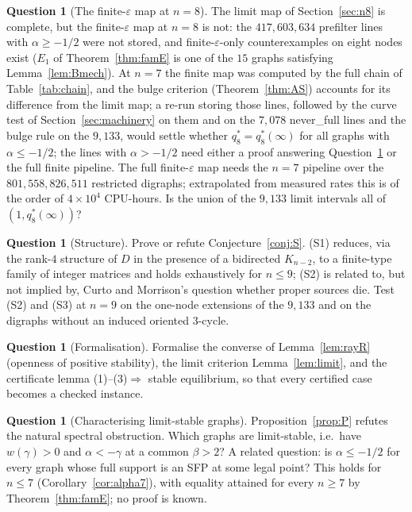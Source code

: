 \documentclass[11pt]{article}
\theoremstyle{definition}
\newtheorem{question}[theorem]{Question}
\newcommand{\eps}{\varepsilon}
\begin{document}
{\begin{question}[The finite-$\eps$ map at $n=8$]
The limit map of Section~\ref{sec:n8} is complete, but the finite-$\eps$ map at $n=8$ is not: the $417{,}603{,}634$ prefilter
lines with $\alpha\ge-1/2$ were not stored, and finite-$\eps$-only counterexamples on eight nodes exist ($E_1$ of
Theorem~\ref{thm:famE} is one of the $15$ graphs satisfying Lemma~\ref{lem:Bmech}). At $n=7$ the finite map was computed by
the full chain of Table~\ref{tab:chain}, and the bulge criterion (Theorem~\ref{thm:AS}) accounts for its difference from the
limit map; a re-run storing those lines, followed by the curve test of Section~\ref{sec:machinery} on them and on the $7{,}078$
never\_full lines and the bulge rule on the $9{,}133$, would settle whether $q_8^*=q_8^*(\infty)$ for all graphs with
$\alpha\le-1/2$; the lines with $\alpha>-1/2$ need either a proof answering Question~\ref{q:char} or the full finite pipeline.
The full finite-$\eps$ map needs the $n=7$ pipeline over the $801{,}558{,}826{,}511$ restricted digraphs; extrapolated from
measured rates this is of the order of $4\times10^4$ CPU-hours.
Is the union of the $9{,}133$ limit intervals all of $(1,q_8^*(\infty))$?
\end{question}

\begin{question}[Structure]
Prove or refute Conjecture~\ref{conj:S}. (S1) reduces, via the rank-$4$ structure of $D$ in the presence of a bidirected
$K_{n-2}$, to a finite-type family of integer matrices and holds exhaustively for $n\le9$; (S2) is related to, but not
implied by, Curto and Morrison's question whether proper sources die. Test (S2) and (S3) at $n=9$ on the one-node extensions
of the $9{,}133$ and on the digraphs without an induced oriented $3$-cycle.
\end{question}

\begin{question}[Formalisation]
Formalise the converse of Lemma~\ref{lem:rayR} (openness of positive stability), the limit criterion Lemma~\ref{lem:limit}, and the
certificate lemma (1)--(3)$\Rightarrow$ stable equilibrium, so that every certified case becomes a checked instance.
\end{question}

\begin{question}[Characterising limit-stable graphs]\label{q:char}
Proposition~\ref{prop:P} refutes the natural spectral obstruction. Which graphs are limit-stable, i.e.\ have $w(\gamma)>0$ and
$\alpha<-\gamma$ at a common $\beta>2$? A related question: is $\alpha\le-1/2$ for every graph whose full support is an SFP at some
legal point? This holds for $n\le7$ (Corollary~\ref{cor:alpha7}), with equality attained for every $n\ge7$ by Theorem~\ref{thm:famE};
no proof is known.
\end{question}

}
\end{document}
